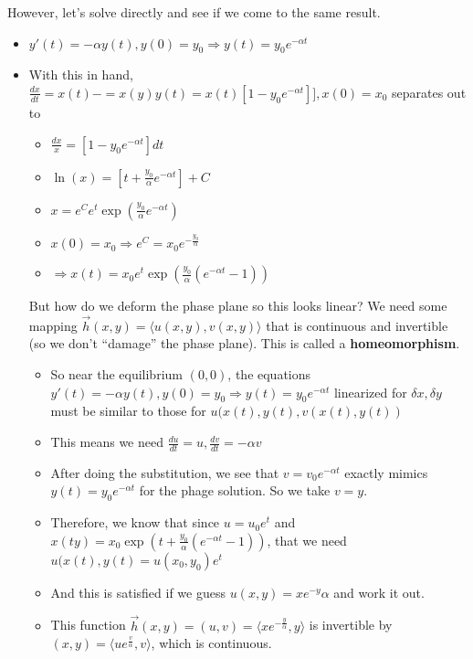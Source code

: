 \documentclass[11pt, oneside]{article}   	%
\begin{document}
However, let's solve directly and see if we come to the same result. 
\begin{itemize}
\item $y'(t) = -\alpha y(t), y(0) = y_0 \Rightarrow y(t) = y_0 e^{-\alpha t}$
\item With this in hand, $\frac{dx}{dt} = x(t) -= x(y)y(t) = x(t)[1-y_0e^{-\alpha t}]] , x(0) = x_0$ separates out to 
\begin{itemize}
\item $\frac{dx}{x} = [1-y_0e^{-\alpha t}]dt $
\item $\ln(x) = [t + \frac{y_0}{\alpha}e^{-\alpha t}] + C $
\item $x = e^Ce^t \exp(\frac{y_0}{\alpha}e^{-\alpha t})$
\item $x(0) = x_0 \Rightarrow e^C = x_0e^{-\frac{y_0}{\alpha}}$
\item $\Rightarrow x(t) = x_0 e^t \exp(\frac{y_0}{\alpha}(e^{-\alpha t} - 1))$
\end{itemize}

But how do we deform the phase plane so this looks linear?  We need some mapping $\vec{h}(x,y) = \langle u(x,y), v(x,y) \rangle$ that is continuous and invertible (so we don't ``damage'' the phase plane).  This is called a \textbf{homeomorphism}.
\begin{itemize}
\item So near the equilibrium $(0,0)$, the equations  $y'(t) = -\alpha y(t), y(0) = y_0 \Rightarrow y(t) = y_0 e^{-\alpha t}$ linearized for $\delta x, \delta y$ must be similar to those for $u(x(t), y(t), v(x(t), y(t))$
\item This means we need $\frac{du}{dt} = u, \frac{dv}{dt} = -\alpha v$
\item After doing the substitution, we see that $v = v_0e^{-\alpha t}$ exactly mimics $y(t) = y_0 e^{-\alpha t}$ for the phage solution.  So we take $v = y$.
\item Therefore, we know that since $u = u_0e^t$ and $x(ty) = x_0 \exp(t + \frac{y_0}{\alpha}(e^{-\alpha t} - 1))$, that we need $u(x(t), y(t) = u(x_0, y_0)e^t$
\item And this is satisfied if we guess $u(x,y) = xe^{-y}{\alpha}$ and work it out.
\item This function $\vec{h}(x,y) = (u, v) = \langle xe^{-\frac{y}{\alpha}}, y \rangle $ is invertible by $(x,y) = \langle ue^{\frac{v}{\alpha}} , v \rangle$, which is continuous.
\end{itemize}

\end{itemize}
\end{document}
